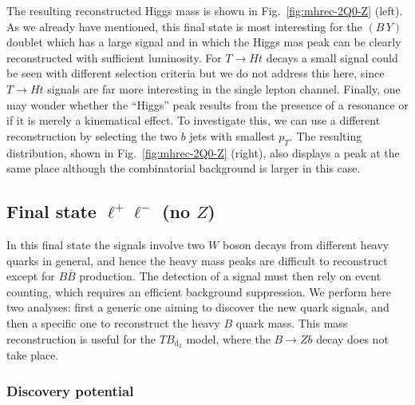 \documentclass[12pt,a4paper]{article}
\newcommand{\BB}{B \bar B}
\newcommand{\TBD}{TB_{\text{d}_2}}
\newcommand{\BY}{(B \, Y)}
\begin{document}
The resulting reconstructed Higgs mass is shown in Fig.~\ref{fig:mhrec-2Q0-Z} (left). As we already have mentioned, this final state is most interesting for the $\BY$ doublet which has a large signal and in which the Higgs mas peak can be clearly reconstructed with sufficient luminosity.
For $T \to Ht$ decays a small signal could be seen with different selection criteria but we do not address this here, since $T \to Ht$ signals are far more interesting in the single lepton channel.
Finally, one may wonder whether the ``Higgs'' peak results from the presence of a resonance or if it is merely a kinematical effect. To investigate this, we can use a different reconstruction by selecting the two $b$ jets with smallest $p_T$. The resulting distribution, shown in Fig.~\ref{fig:mhrec-2Q0-Z} (right), also displays a peak at the same place although the combinatorial background is larger in this case.



\subsection{Final state $\ell^+ \ell^-$ (no $Z$)}


In this final state the signals involve two $W$ boson decays from different heavy quarks in general, and hence the heavy mass peaks are difficult to reconstruct except for $\BB$ production. The detection of a signal must then rely on event counting, which requires an efficient background suppression. We perform here two analyses: first a generic one aiming to discover the new quark signals, and then a specific one to reconstruct the heavy $B$ quark mass. This mass reconstruction is useful for the $\TBD$ model, where the $B \to Zb$ decay does not take place.

\subsubsection{Discovery potential}
\end{document}
